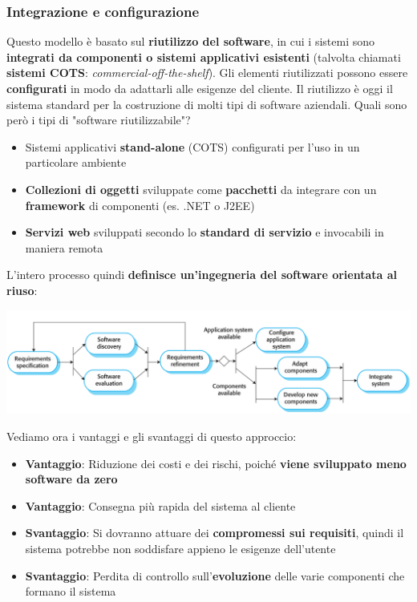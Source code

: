 \documentclass[12pt]{article}
\begin{document}
\subsubsection{Integrazione e configurazione}
Questo modello è basato sul \textbf{riutilizzo del software}, in cui i sistemi sono \textbf{integrati da componenti o sistemi applicativi esistenti} (talvolta chiamati \textbf{sistemi COTS}: \textit{commercial-off-the-shelf}).
Gli elementi riutilizzati possono essere \textbf{configurati} in modo da adattarli alle esigenze del cliente. Il riutilizzo è oggi il sistema standard per la costruzione di molti tipi di software aziendali. \newline
Quali sono però i tipi di "software riutilizzabile"?
\begin{itemize}
    \item Sistemi applicativi \textbf{stand-alone} (COTS) configurati per l'uso in un particolare ambiente
    \item \textbf{Collezioni di oggetti} sviluppate come \textbf{pacchetti} da integrare con un \textbf{framework} di componenti (es. .NET o J2EE)
    \item \textbf{Servizi web} sviluppati secondo lo \textbf{standard di servizio} e invocabili in maniera remota
\end{itemize}
L'intero processo quindi \textbf{definisce un'ingegneria del software orientata al riuso}:
\begin{center}
    \includegraphics[width = 1.10\textwidth]{Images/13.png}
\end{center}
\newpage
\noindent
Vediamo ora i vantaggi e gli svantaggi di questo approccio:
\begin{itemize}
    \item \textbf{Vantaggio}: Riduzione dei costi e dei rischi, poiché \textbf{viene sviluppato meno software da zero}
    \item \textbf{Vantaggio}: Consegna più rapida del sistema al cliente
    \item \textbf{Svantaggio}: Si dovranno attuare dei \textbf{compromessi sui requisiti}, quindi il sistema potrebbe non soddisfare appieno le esigenze dell'utente
    \item \textbf{Svantaggio}: Perdita di controllo sull'\textbf{evoluzione} delle varie componenti che formano il sistema
\end{itemize}
\end{document}
